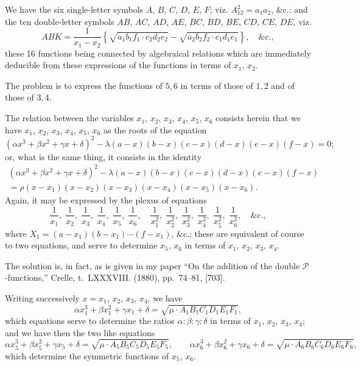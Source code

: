 \documentclass[11pt,a4paper]{book}
\begin{document}
\begin{art}
We have the six single-letter symbols $A$, $B$, $C$, $D$, $E$, $F$; viz. $A_{12}^2 = a_1a_2$, \&c.: and the ten double-letter symbols $AB$, $AC$, $AD$, $AE$, $BC$, $BD$, $BE$, $CD$, $CE$, $DE$, viz.
\[
ABK = \frac{1}{x_1-x_2}\left\{\sqrt{a_1b_1f_1 \cdot c_2d_2e_2} - \sqrt{a_2b_2f_2 \cdot c_1d_1e_1}\right\}, \quad \text{\&c.},
\]
these 16 functions being connected by algebraical relations which are immediately deducible from these expressions of the functions in terms of $x_1$, $x_2$.

The problem is to express the functions of $5,6$ in terms of those of $1,2$ and of those of $3,4$.

The relation between the variables $x_1$, $x_2$, $x_3$, $x_4$, $x_5$, $x_6$ consists herein that we have $x_1$, $x_2$, $x_3$, $x_4$, $x_5$, $x_6$ as the roots of the equation
\[
(\alpha x^3 + \beta x^2 + \gamma x + \delta)^2 - \lambda(a-x)(b-x)(c-x)(d-x)(e-x)(f-x) = 0;
\]
or, what is the same thing, it consists in the identity
\begin{multline*}
(\alpha x^3 + \beta x^2 + \gamma x + \delta)^2 - \lambda(a-x)(b-x)(c-x)(d-x)(e-x)(f-x) \\
= \rho(x-x_1)(x-x_2)(x-x_3)(x-x_4)(x-x_5)(x-x_6).
\end{multline*}
Again, it may be expressed by the plexus of equations
\[
\frac{1}{x_1},\; \frac{1}{x_2},\; \frac{1}{x_3},\; \frac{1}{x_4},\; \frac{1}{x_5},\; \frac{1}{x_6}, \quad
\frac{1}{x_1^2},\; \frac{1}{x_2^2},\; \frac{1}{x_3^2},\; \frac{1}{x_4^2},\; \frac{1}{x_5^2},\; \frac{1}{x_6^2}, \quad \&\text{c.},
\]
where $X_1 = (a-x_1)(b-x_1)\cdots(f-x_1)$, \&c.; these are equivalent of course to two equations, and serve to determine $x_5$, $x_6$ in terms of $x_1$, $x_2$, $x_3$, $x_4$.
\end{art}

\begin{art}
The solution is, in fact, as is given in my paper ``On the addition of the double $\mathcal{P}$-functions,'' Crelle, t.~LXXXVIII. (1880), pp.~74--81, [703].

Writing successively $x = x_1$, $x_2$, $x_3$, $x_4$, we have
\[
\alpha x_1^3 + \beta x_1^2 + \gamma x_1 + \delta = \sqrt{\mu \cdot A_1 B_1 C_1 D_1 E_1 F_1},
\]
which equations serve to determine the ratios $\alpha:\beta:\gamma:\delta$ in terms of $x_1$, $x_2$, $x_3$, $x_4$; and we have then the two like equations
\[
\alpha x_5^3 + \beta x_5^2 + \gamma x_5 + \delta = \sqrt{\mu \cdot A_5 B_5 C_5 D_5 E_5 F_5}, \qquad
\alpha x_6^3 + \beta x_6^2 + \gamma x_6 + \delta = \sqrt{\mu \cdot A_6 B_6 C_6 D_6 E_6 F_6},
\]
which determine the symmetric functions of $x_5$, $x_6$.
\end{art}
\end{document}
